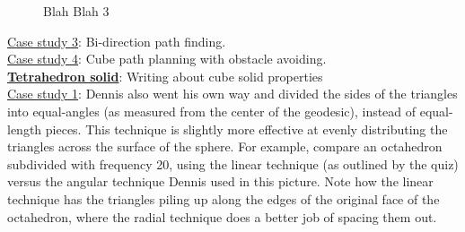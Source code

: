 \begin{center}
\begin{figure}[h]
\hfill
{}
\caption{Blah Blah 3}
\end{figure}
\end{center}

\noindent\uline{Case study 3}: Bi-direction path finding.\\

\noindent\uline{Case study 4}: Cube path planning with obstacle avoiding.\\

\noindent\uline{\textbf{Tetrahedron solid}}:
Writing about cube solid properties\\

\noindent\uline{Case study 1}:
Dennis also went his own way and divided the sides of the triangles into equal-angles (as measured from the center of the geodesic), instead of equal-length pieces. This technique is slightly more effective at evenly distributing the triangles across the surface of the sphere. For example, compare an octahedron subdivided with frequency 20, using the linear technique (as outlined by the quiz) versus the angular technique Dennis used in this picture. Note how the linear technique has the triangles piling up along the edges of the original face of the octahedron, where the radial technique does a better job of spacing them out.\\

